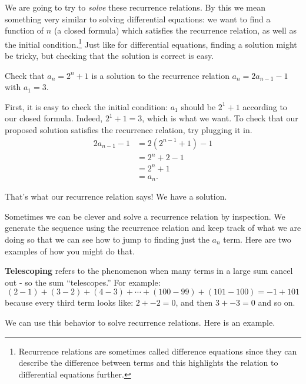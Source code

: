 \documentclass[11pt,]{book}
\newcommand{\terminology}[1]{\textbf{#1}}
\theoremstyle{ptxplainnotitle}
\theoremstyle{ptxplaintitle}
\theoremstyle{ptxdefinitionnotitle}
\theoremstyle{ptxdefinitiontitle}
\theoremstyle{ptxdefinitionnotitle}
\theoremstyle{ptxdefinitiontitle}
\theoremstyle{ptxdefinitionnotitle}
\theoremstyle{ptxdefinitiontitle}
\theoremstyle{ptxdefinitiontitlenonumber}
\theoremstyle{ptxdefinitiontitlenonumber}
\numberwithin{equation}{chapter}
\newcommand{\amp}{&}
\begin{document}
\hypertarget{p-425}{}%
We are going to try to \emph{solve} these recurrence relations. By this we mean something very similar to solving differential equations: we want to find a function of \(n\) (a closed formula) which satisfies the recurrence relation, as well as the initial condition.\footnote{Recurrence relations are sometimes called difference equations since they can describe the difference between terms and this highlights the relation to differential equations further.\label{fn-2}} Just like for differential equations, finding a solution might be tricky, but checking that the solution is correct is easy.%
\begin{example}\label{example-19}
\hypertarget{p-426}{}%
Check that \(a_n = 2^n + 1\) is a solution to the recurrence relation \(a_n = 2a_{n-1} - 1\) with \(a_1 = 3\).%
\par\smallskip%
\noindent\textbf{}\hypertarget{solution-65}{}\hypertarget{p-427}{}%
First, it is easy to check the initial condition: \(a_1\) should be \(2^1 + 1\) according to our closed formula. Indeed, \(2^1 + 1 = 3\), which is what we want. To check that our proposed solution satisfies the recurrence relation, try plugging it in.%
\begin{align*}
2a_{n-1} - 1 \amp = 2(2^{n-1} + 1) - 1 \\
\amp = 2^n + 2 - 1 \\
\amp = 2^n +1\\
\amp = a_n.
\end{align*}
%
\par
\hypertarget{p-428}{}%
That's what our recurrence relation says! We have a solution.%
\end{example}
\hypertarget{p-429}{}%
Sometimes we can be clever and solve a recurrence relation by inspection. We generate the sequence using the recurrence relation and keep track of what we are doing so that we can see how to jump to finding just the \(a_n\) term. Here are two examples of how you might do that.%
\par
\hypertarget{p-430}{}%
\terminology{Telescoping} refers to the phenomenon when many terms in a large sum cancel out - so the sum ``telescopes.'' For example:%
\begin{equation*}
(2 - 1) + (3 - 2) + (4 - 3) + \cdots + (100 - 99) + (101 - 100) = -1 + 101
\end{equation*}
because every third term looks like: \(2 + -2 = 0\), and then \(3 + -3 = 0\) and so on.%
\par
\hypertarget{p-431}{}%
We can use this behavior to solve recurrence relations. Here is an example.%
\end{document}
